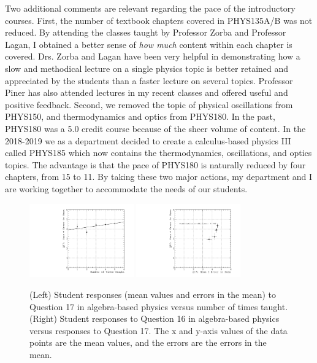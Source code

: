 \documentclass[../../main.tex]{subfiles}
\begin{document}
Two additional comments are relevant regarding the pace of the introductory courses.  First, the number of textbook chapters covered in PHYS135A/B was not reduced.  By attending the classes taught by Professor Zorba and Professor Lagan, I obtained a better sense of \textit{how much} content within each chapter is covered.  Drs. Zorba and Lagan have been very helpful in demonstrating how a slow and methodical lecture on a single physics topic is better retained and appreciated by the students than a faster lecture on several topics.  Professor Piner has also attended lectures in my recent classes and offered useful and positive feedback.  Second, we removed the topic of physical oscillations from PHYS150, and thermodynamics and optics from PHYS180.  In the past, PHYS180 was a 5.0 credit course because of the sheer volume of content.  In the 2018-2019 we as a department decided to create a calculus-based physics III called PHYS185 which now contains the thermodynamics, oscillations, and optics topics.  The advantage is that the pace of PHYS180 is naturally reduced by four chapters, from 15 to 11.  By taking these two major actions, my department and I are working together to accommodate the needs of our students. \\ \hspace{0.1cm}

\begin{figure}[hb]
\centering
\includegraphics[width=0.4\textwidth]{Q17_algebra_based.pdf}
\includegraphics[width=0.4\textwidth]{Q16_Q17_algebra_based.pdf}
\caption{\label{fig:courses:intro_q17}  (Left) Student responses (mean values and errors in the mean) to Question 17 in algebra-based physics versus number of times taught. (Right) Student responses to Question 16 in algebra-based physics versus responses to Question 17.  The x and y-axis values of the data points are the mean values, and the errors are the errors in the mean.}
\end{figure}
\end{document}
